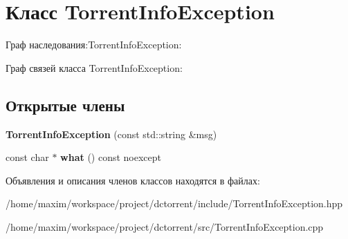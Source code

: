 \hypertarget{class_torrent_info_exception}{}\section{Класс Torrent\+Info\+Exception}
\label{class_torrent_info_exception}


Граф наследования\+:Torrent\+Info\+Exception\+:


Граф связей класса Torrent\+Info\+Exception\+:
\subsection*{Открытые члены}
\begin{DoxyCompactItemize}
\item 
\mbox{\label{class_torrent_info_exception_a06a3037ffb2b25fcef314213b1e40cf6}} 
{\bfseries Torrent\+Info\+Exception} (const std\+::string \&msg)
\item 
\mbox{\label{class_torrent_info_exception_a706588e0fbed005799b8b149abd21091}} 
const char $\ast$ {\bfseries what} () const noexcept
\end{DoxyCompactItemize}


Объявления и описания членов классов находятся в файлах\+:\begin{DoxyCompactItemize}
\item 
/home/maxim/workspace/project/dctorrent/include/Torrent\+Info\+Exception.\+hpp\item 
/home/maxim/workspace/project/dctorrent/src/Torrent\+Info\+Exception.\+cpp\end{DoxyCompactItemize}
